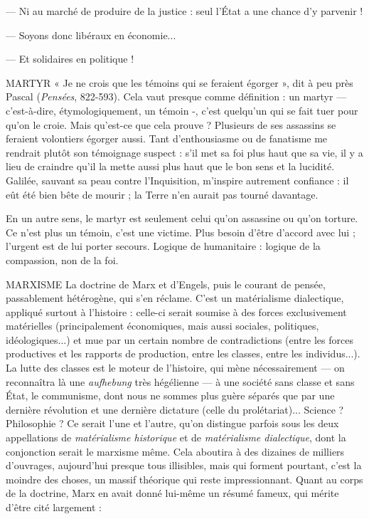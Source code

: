 — Ni au marché de produire de la justice : seul l’État a une chance d'y
parvenir !

— Soyons donc libéraux en économie...

— Et solidaires en politique !

MARTYR « Je ne crois que les témoins qui se feraient égorger », dit à peu
près Pascal ({\it Pensées}, 822-593). Cela vaut presque comme définition :
un martyr — c’est-à-dire, étymologiquement, un témoin -, c’est
quelqu’un qui se fait tuer pour qu’on le croie. Mais qu'est-ce que cela prouve ?
Plusieurs de ses assassins se feraient volontiers égorger aussi. Tant d’enthousiasme
ou de fanatisme me rendrait plutôt son témoignage suspect : s’il met sa
foi plus haut que sa vie, il y a lieu de craindre qu’il la mette aussi plus haut que
le bon sens et la lucidité. Galilée, sauvant sa peau contre l’Inquisition, m’inspire
autrement confiance : il eût été bien bête de mourir ; la Terre n’en aurait
pas tourné davantage.

En un autre sens, le martyr est seulement celui qu’on assassine ou qu’on
torture. Ce n’est plus un témoin, c’est une victime. Plus besoin d’être d’accord
avec lui ; l’urgent est de lui porter secours. Logique de humanitaire : logique
de la compassion, non de la foi.

MARXISME La doctrine de Marx et d’Engels, puis le courant de pensée,
passablement hétérogène, qui s’en réclame. C’est un matérialisme
dialectique, appliqué surtout à l’histoire : celle-ci serait soumise à des
forces exclusivement matérielles (principalement économiques, mais aussi
sociales, politiques, idéologiques...) et mue par un certain nombre de contradictions
(entre les forces productives et les rapports de production, entre les
classes, entre les individus...). La lutte des classes est le moteur de l’histoire, qui
mène nécessairement — on reconnaîtra là une {\it aufhebung} très hégélienne — à une
société sans classe et sans État, le communisme, dont nous ne sommes plus
guère séparés que par une dernière révolution et une dernière dictature (celle
du prolétariat)... Science ? Philosophie ? Ce serait l’une et l’autre, qu’on distingue
parfois sous les deux appellations de {\it matérialisme historique} et de {\it matérialisme
dialectique}, dont la conjonction serait le marxisme même. Cela aboutira
à des dizaines de milliers d'ouvrages, aujourd’hui presque tous illisibles,
mais qui forment pourtant, c’est la moindre des choses, un massif théorique
qui reste impressionnant. Quant au corps de la doctrine, Marx en avait donné
lui-même un résumé fameux, qui mérite d’être cité largement :

